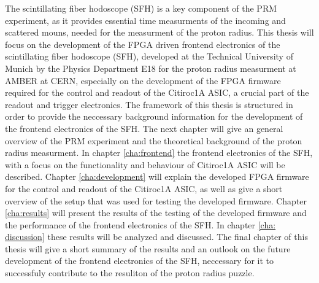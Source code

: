 \newline
The scintillating fiber hodoscope (SFH) is a key component of the PRM experiment, as it provides essential time measurments of the incoming and scattered mouns, needed for the measurment of the proton radius.\Autocite{ProposalAmber}
\newline
This thesis will focus on the development of the FPGA driven frontend electronics of the scintillating fiber hodoscope (SFH),
developed at the Technical University of Munich by the Physics Department E18 for the proton radius measurment at AMBER at CERN,
especially on the development of the FPGA firmware required for the control and readout of the Citiroc1A ASIC,
a crucial part of the readout and trigger electronics.
\newline 
The framework of this thesis is structured in order to provide the neccessary background information for the development of the frontend electronics of the SFH.
\newline
The next chapter will give an general overview of the PRM experiment and the theoretical background of the proton radius measurment.
\newline 
In chapter \ref{cha:frontend} the frontend electronics of the SFH, with a focus on the functionality and behaviour of Citiroc1A ASIC will be described.
\newline
Chapter \ref{cha:development} will explain the developed FPGA firmware for the control and readout of the Citiroc1A ASIC, as well as give a short overview of the setup that was used for testing the developed firmware.
\newline
Chapter \ref{cha:results} will present the results of the testing of the developed firmware and the performance of the frontend electronics of the SFH.
\newline
In chapter \ref{cha: discussion} these results will be analyzed and discussed.
\newline 
The final chapter of this thesis will give a short summary of the results and an outlook on the future development of the frontend electronics of the SFH,
neccessary for it to successfuly contribute to the resuliton of the proton radius puzzle.



 
